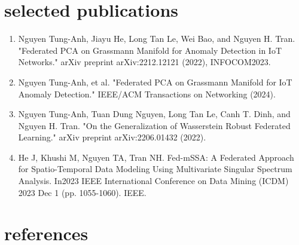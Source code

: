 \documentclass{ExpressiveResume}
\begin{document}
\section{selected publications}
\begin{enumerate}
    \item Nguyen Tung-Anh, Jiayu He, Long Tan Le, Wei Bao, and Nguyen H. Tran. "Federated PCA on Grassmann Manifold for Anomaly Detection in IoT Networks." arXiv preprint arXiv:2212.12121 (2022), INFOCOM2023.
    \item Nguyen Tung-Anh, et al. "Federated PCA on Grassmann Manifold for IoT Anomaly Detection." IEEE/ACM Transactions on Networking (2024).
    \item Nguyen Tung-Anh, Tuan Dung Nguyen, Long Tan Le, Canh T. Dinh, and Nguyen H. Tran. "On the Generalization of Wasserstein Robust Federated Learning." arXiv preprint arXiv:2206.01432 (2022).
    \item He J, Khushi M, Nguyen TA, Tran NH. Fed-mSSA: A Federated Approach for Spatio-Temporal Data Modeling Using Multivariate Singular Spectrum Analysis. In2023 IEEE International Conference on Data Mining (ICDM) 2023 Dec 1 (pp. 1055-1060). IEEE.
\end{enumerate}
\section{references}

\end{document}
